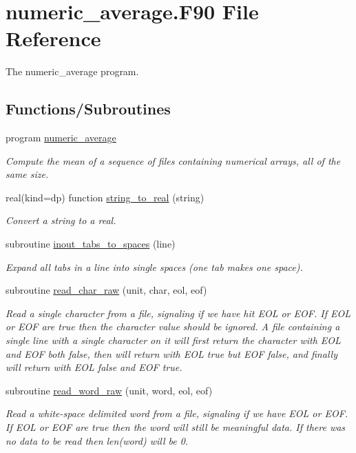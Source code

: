 \hypertarget{numeric__average_8_f90}{}\section{numeric\+\_\+average.\+F90 File Reference}
\label{numeric__average_8_f90}


The numeric\+\_\+average program.  


\subsection*{Functions/\+Subroutines}
\begin{DoxyCompactItemize}
\item 
program \mbox{\hyperlink{numeric__average_8_f90_ace5b93343315ffd2ea1127474ca562de}{numeric\+\_\+average}}
\begin{DoxyCompactList}\small\item\em Compute the mean of a sequence of files containing numerical arrays, all of the same size. \end{DoxyCompactList}\item 
real(kind=dp) function \mbox{\hyperlink{numeric__average_8_f90_adb310d82883181f22ab78049de9b26c6}{string\+\_\+to\+\_\+real}} (string)
\begin{DoxyCompactList}\small\item\em Convert a string to a real. \end{DoxyCompactList}\item 
subroutine \mbox{\hyperlink{numeric__average_8_f90_aa25afb27dd748ad53f6222cb6b79f401}{inout\+\_\+tabs\+\_\+to\+\_\+spaces}} (line)
\begin{DoxyCompactList}\small\item\em Expand all tabs in a line into single spaces (one tab makes one space). \end{DoxyCompactList}\item 
subroutine \mbox{\hyperlink{numeric__average_8_f90_a3d7300225d77c26e8e93183430b5e803}{read\+\_\+char\+\_\+raw}} (unit, char, eol, eof)
\begin{DoxyCompactList}\small\item\em Read a single character from a file, signaling if we have hit E\+OL or E\+OF. If E\+OL or E\+OF are true then the character value should be ignored. A file containing a single line with a single character on it will first return the character with E\+OL and E\+OF both false, then will return with E\+OL true but E\+OF false, and finally will return with E\+OL false and E\+OF true. \end{DoxyCompactList}\item 
subroutine \mbox{\hyperlink{numeric__average_8_f90_a792d711913a5fbab5a85f9f802152136}{read\+\_\+word\+\_\+raw}} (unit, word, eol, eof)
\begin{DoxyCompactList}\small\item\em Read a white-\/space delimited word from a file, signaling if we have E\+OL or E\+OF. If E\+OL or E\+OF are true then the word will still be meaningful data. If there was no data to be read then len(word) will be 0. \end{DoxyCompactList}\end{DoxyCompactItemize}


